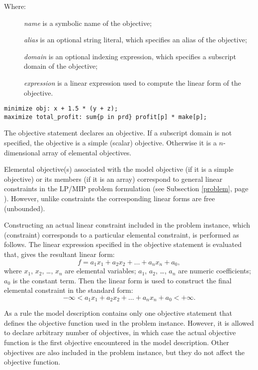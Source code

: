\documentclass[10pt]{article}
\begin{document}
\begin{description}
\item[{\rm Where:}\hspace*{23pt}] {\it name} is a symbolic name of the
objective;
\item[\hspace*{54pt}] {\it alias} is an optional string literal, which
specifies an alias of the objective;
\item[\hspace*{54pt}] {\it domain} is an optional indexing expression,
which specifies a subscript domain of the objective;
\item[\hspace*{54pt}] {\it expression} is a linear expression used to
compute the linear form of the objective.
\end{description}


\begin{verbatim}
minimize obj: x + 1.5 * (y + z);
maximize total_profit: sum{p in prd} profit[p] * make[p];
\end{verbatim}

The objective statement declares an objective. If a subscript domain is
not specified, the objective is a simple (scalar) objective. Otherwise
it is a $n$-dimensional array of elemental objectives.

Elemental objective(s) associated with the model objective (if it is a
simple objective) or its members (if it is an array) correspond to
general linear constraints in the LP/MIP problem formulation (see
Subsection \ref{problem}, page \pageref{problem}). However, unlike
constraints the corresponding linear forms are free (unbounded).

Constructing an actual linear constraint included in the problem
instance, which (constraint) corresponds to a particular elemental
constraint, is performed as follows. The linear expression specified in
the objective statement is evaluated that, gives the resultant linear
form:
$$f=a_1x_1+a_2x_2+\dots+a_nx_n+a_0,$$
where $x_1$, $x_2$, \dots, $x_n$ are elemental variables; $a_1$, $a_2$,
\dots, $a_n$ are numeric coefficients; $a_0$ is the constant term. Then
the linear form is used to construct the final elemental constraint in
the standard form:
$$-\infty<a_1x_1+a_2x_2+\dots+a_nx_n+a_0<+\infty.$$

As a rule the model description contains only one objective statement
that defines the objective function used in the problem instance.
However, it is allowed to declare arbitrary number of objectives, in
which case the actual objective function is the first objective
encountered in the model description. Other objectives are also
included in the problem instance, but they do not affect the objective
function.
\end{document}
